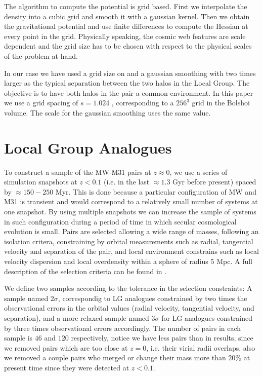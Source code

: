 \documentclass{emulateapj}
\newcommand{\mpc}{\rm{Mpc}}
\newcommand{\hMpc}{{\ifmmode{h^{-1}{\rm Mpc}}\else{$h^{-1}$Mpc }\fi}}
\begin{document}
The algorithm to compute the potential is grid based. First we
interpolate the density into a cubic grid and smooth it with a
gaussian kernel. Then we obtain the gravitational potential and use
finite differences to compute the Hessian at every point in the
grid. Physically speaking, the cosmic web features are scale
dependent and the grid size has to be chosen with respect to the
physical scales of the problem at hand.

In our case we have used a grid size on and a gaussian smoothing with
two times larger as the typical separation between the two
halos in the Local Group. The objective is to have both halos in the
pair a common environment. In this paper we use a grid spacing of
$s=1.024$ \hMpc, corresponding to a $256^3$ grid in the Bolshoi
volume. The scale for the gaussian smoothing uses the same value.


\section{Local Group Analogues}

To construct a sample of the MW-M31 pairs at $z\approx 0$, we use a series of simulation snapshots  at $z<0.1$ (i.e. in the last $\approx 1.3$ Gyr before present) spaced by $\approx 150-250$ Myr. This is done because a particular configuration of MW and M31 is transient and would correspond to a relatively small number of systems at one snapshot. By using multiple snapshots we can increase the sample of systems in such configuration during a period of time in which secular cosmological evolution is small.
Pairs are selected allowing a wide range of masses, following an isolation critera, constraining by orbital measurements such as radial, tangential velocity and separation of the pair, and local environment constrains such as local velocity dispersion and local overdensity within a sphere of radius $5$ \mpc. A full description of the selection criteria can be found in \citet{lganalogues,sat}.

We define two samples according to the tolerance in the selection constraints:
A sample named $2\sigma$, correspondig to LG analogues constrained by two times the observational errors in the orbital values (radial velocity, tangential velocity, and separation), and a more relaxed sample named $3\sigma$ for LG analogues constrained by three times observational errors accordingly. The number of pairs in each sample is $46$ and $120$ respectively, notice we have less pairs than in \citet{lganalogues} results, since we removed pairs which are too close at $z=0$, i.e. their virial radii overlaps, also we removed a couple pairs who merged or change their mass more than $20\%$ at present time since they were detected at $z<0.1$.
\end{document}
